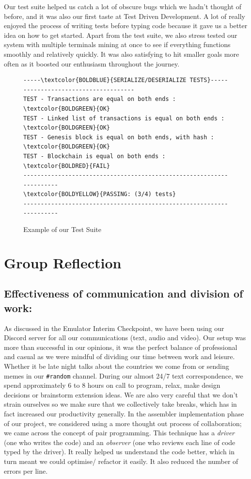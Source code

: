\documentclass[a4paper]{article}
\begin{document}
Our test suite helped us catch a lot of obscure bugs which we hadn't thought of before, and it was also our first taste at Test Driven Development. A lot of really enjoyed the process of writing tests before typing code because it gave us a better idea on how to get started. Apart from the test suite, we also stress tested our system with multiple terminals mining at once to see if everything functions smoothly and relatively quickly. It was also satisfying to hit smaller goals more often as it boosted our enthusiasm throughout the journey.

\begin{figure}[htp]
\centering
\begin{BVerbatim}[commandchars=\\\{\}, fontsize = \small]
-----\textcolor{BOLDBLUE}{SERIALIZE/DESERIALIZE TESTS}-------------------------------------
TEST - Transactions are equal on both ends : \textcolor{BOLDGREEN}{OK}
TEST - Linked list of transactions is equal on both ends : \textcolor{BOLDGREEN}{OK}
TEST - Genesis block is equal on both ends, with hash : \textcolor{BOLDGREEN}{OK}
TEST - Blockchain is equal on both ends : \textcolor{BOLDRED}{FAIL}
---------------------------------------------------------------------
\textcolor{BOLDYELLOW}{PASSING: (3/4) tests}
---------------------------------------------------------------------
\end{BVerbatim}
\caption{Example of our Test Suite}
\label{fig:test-example}
\end{figure}

\newpage
\section{Group Reflection}
\subsection{Effectiveness of communication and division of work:}

As discussed in the Emulator Interim Checkpoint, we have been using our Discord server for all our communications (text, audio and video). Our setup was more than successful in our opinions, it was the perfect balance of professional and casual as we were mindful of dividing our time between work and leisure. Whether it be late night talks about the countries we come from or sending memes in our \verb|#random| channel. During our almost 24/7 text correspondence, we spend approximately 6 to 8 hours on call to program, relax, make design decisions or brainstorm extension ideas. We are also very careful that we don't strain ourselves so we make sure that we collectively take breaks, which has in fact increased our productivity generally. In the assembler implementation phase of our project, we considered using a more thought out process of collaboration; we came across the concept of pair programming. This technique has a \textit{driver} (one who writes the code) and an \textit{observer} (one who reviews each line of code typed by the driver). It really helped us understand the code better, which in turn meant we could optimise/ refactor it easily. It also reduced the number of errors per line.
\end{document}

